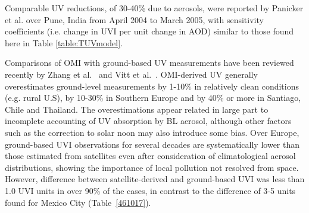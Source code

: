 \documentclass[10pt]{article}
\begin{document}
Comparable UV reductions, of 30-40\% due to aerosols, were reported by
Panicker et al.\cite{Panicker_2009} over Pune, India from April 2004 to
March 2005, with sensitivity coefficients (i.e. change in UVI per unit
change in AOD) similar to those found here in
Table \ref{table:TUVmodel}.

Comparisons of OMI with ground-based UV measurements have been reviewed
recently by Zhang et al.~\cite{Zhang_2019} and Vitt et
al.~\cite{Vitt_2020}. OMI-derived UV generally overestimates
ground-level measurements by 1-10\% in relatively clean conditions (e.g.
rural U.S), by 10-30\% in Southern Europe and by 40\% or more in
Santiago, Chile\cite{Cabrera_2012} and Thailand\cite{Janjai_2013}. The
overestimations appear related in large part to incomplete accounting of
UV absorption by BL aerosol, although other factors such as the
correction to solar noon may also introduce some
bias.\cite{Zhang_2019} Over Europe, ground-based UVI observations for
several decades are systematically lower than those estimated from
satellites even after consideration of climatological aerosol
distributions, showing the importance of local pollution not resolved
from space.\cite{Vitt_2020} However, difference between
satellite-derived and ground-based UVI was less than 1.0 UVI units in
over 90\% of the cases, in contrast to the difference of 3-5 units found
for Mexico City (Table~{\ref{461017}}).
\end{document}

